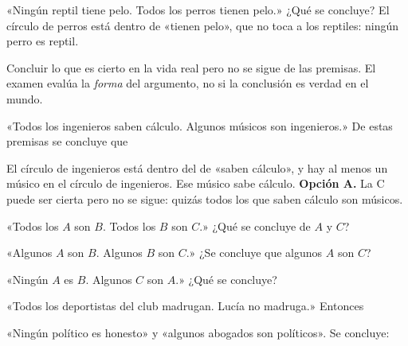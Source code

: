 \begin{ejemplo}[Ninguno]
«Ningún reptil tiene pelo. Todos los perros tienen pelo.» ¿Qué se concluye?
\solucion El círculo de perros está dentro de «tienen pelo», que no toca a los reptiles: ningún perro es reptil.
\end{ejemplo}

\begin{trampa}
Concluir lo que es cierto en la vida real pero no se sigue de las premisas. El examen evalúa la \emph{forma} del
argumento, no si la conclusión es verdad en el mundo.
\end{trampa}

\begin{reto}
«Todos los ingenieros saben cálculo. Algunos músicos son ingenieros.» De estas premisas se concluye que
\end{reto}

\begin{retoresuelto}
El círculo de ingenieros está dentro del de «saben cálculo», y hay al menos un músico en el círculo de ingenieros. Ese
músico sabe cálculo. \textbf{Opción A.} La C puede ser cierta pero no se sigue: quizás todos los que saben cálculo son
músicos.
\end{retoresuelto}

\taller
{}
\begin{ejercicios}
\item «Todos los $A$ son $B$. Todos los $B$ son $C$.» ¿Qué se concluye de $A$ y $C$? 
\item «Algunos $A$ son $B$. Algunos $B$ son $C$.» ¿Se concluye que algunos $A$ son $C$? 
\item «Ningún $A$ es $B$. Algunos $C$ son $A$.» ¿Qué se concluye? 
\end{ejercicios}
\begin{ejercicios}
\item «Todos los deportistas del club madrugan. Lucía no madruga.» Entonces
\item «Ningún político es honesto» y «algunos abogados son políticos». Se concluye:
\end{ejercicios}


